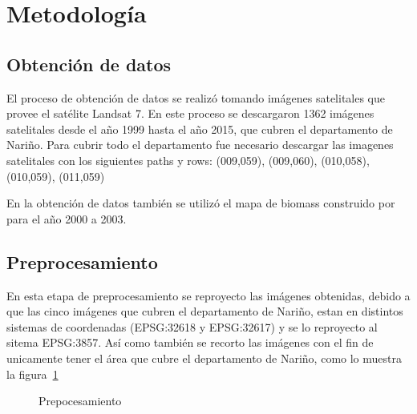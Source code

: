 
\section{Metodología}

\subsection{Obtención de datos}

El proceso de obtención de datos se realizó tomando imágenes satelitales que provee el satélite
Landsat 7. En este proceso se descargaron 1362 imágenes satelitales desde el año 1999 hasta el año 2015, que cubren el 
departamento de Nariño. Para cubrir todo el departamento fue necesario descargar las imagenes satelitales con 
los siguientes paths y rows: (009,059), (009,060), (010,058), (010,059), (011,059) 

En la obtención de datos también se utilizó el mapa de biomass construido por \cite{baccini2008afirst} 
para el año 2000 a 2003.

\subsection{Preprocesamiento}

En esta etapa de preprocesamiento se reproyecto las imágenes obtenidas, debido a que las cinco imágenes
que cubren el departamento de Nariño, estan en distintos sistemas de coordenadas (EPSG:32618 y EPSG:32617) y se 
lo reproyecto al sitema EPSG:3857. Así como también se recorto las imágenes con el fin de unicamente tener 
el área que cubre el departamento de Nariño, como lo muestra la figura~\ref{fig:Recortar imágenes}

\begin{figure}
  \centering
  \vfill
  \caption{Prepocesamiento}
  \label{fig:Recortar imágenes}
\end{figure}

